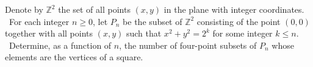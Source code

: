 Denote by $\mathbb Z^2$ the set of all points $(x,y)$ in the plane with integer coordinates.  For each integer $n\geq 0$, let $P_n$ be the subset of $\mathbb Z^2$ consisting of the point $(0,0)$ together with all points $(x,y)$ such that $x^2+y^2=2^k$ for some integer $k\leq n$.  Determine, as a function of $n$, the number of four-point subsets of $P_n$ whose elements are the vertices of a square.